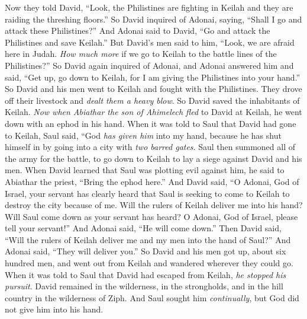 \begin{biblechapter} %
 Now they told David, “Look, the Philistines are fighting in Keilah and they are raiding the threshing floors.”
\verse So David inquired of Adonai, saying, “Shall I go and attack these Philistines?” And Adonai said to David, “Go and attack the Philistines and save Keilah.”
\verse But David’s men said to him, “Look, we are afraid here in Judah. \textit{How much more} if we go to Keilah to the battle lines of the Philistines?”
\verse So David again inquired of Adonai, and Adonai answered him and said, “Get up, go down to Keilah, for I am giving the Philistines into your hand.”
\verse So David and his men went to Keilah and fought with the Philistines. They drove off their livestock and \textit{dealt them a heavy blow}. So David saved the inhabitants of Keilah.
 \textit{Now when Abiathar the son of Ahimelech fled} to David at Keilah, he went down with an ephod in his hand.
\verse When it was told to Saul that David had gone to Keilah, Saul said, “God \textit{has given him} into my hand, because he has shut himself in by going into a city with \textit{two barred gates}.
\verse Saul then summoned all of the army for the battle, to go down to Keilah to lay a siege against David and his men.
\verse When David learned that Saul was plotting evil against him, he said to Abiathar the priest, “Bring the ephod here.”
\verse And David said, “O Adonai, God of Israel, your servant has clearly heard that Saul is seeking to come to Keilah to destroy the city because of me.
\verse Will the rulers of Keilah deliver me into his hand? Will Saul come down as your servant has heard? O Adonai, God of Israel, please tell your servant!” And Adonai said, “He will come down.”
\verse Then David said, “Will the rulers of Keilah deliver me and my men into the hand of Saul?” And Adonai said, “They will deliver you.”
\verse So David and his men got up, about six hundred men, and went out from Keilah and wandered wherever they could go. When it was told to Saul that David had escaped from Keilah, \textit{he stopped his pursuit}.
 David remained in the wilderness, in the strongholds, and in the hill country in the wilderness of Ziph. And Saul sought him \textit{continually}, but God did not give him into his hand.

\end{biblechapter}
